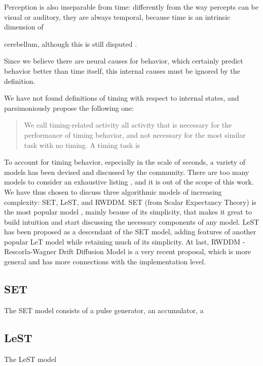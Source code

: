     
    
    
    Perception is also inseparable from time: differently from the way percepts can be visual or auditory, they are always temporal, because time is an intrinsic dimension of  
 
 
    cerebellum, although this is still disputed \cite{ohmae2017cerebellar, nichelli1996perceptual}.
 
    Since we believe there are neural causes for behavior, which certainly predict behavior better than time itself, this internal causes must be ignored by the definition. 
 
    We have not found definitions of timing with respect to internal states, and parsimoniously propose the following one: 
    \begin{quote}
    We call timing-related activity all activity that is necessary for the performance of timing behavior, and not necessary for the most similar task with no timing.
    A timing task is 
    \end{quote}
    
    
    
        To account for timing behavior, especially in the scale of seconds, a variety of models has been devised and discussed by the community. There are too many models to consider an exhaustive listing \cite{}, and it is out of the scope of this work. We have thus chosen to discuss three algorithmic models of increasing complexity: SET, LeST, and RWDDM. SET (from Scalar Expectancy Theory) is the most popular model \cite{}, mainly beause of its simplicity, that makes it great to build intuition and start discussing the necessary components of any model. LeST has been proposed as a descendant of the SET model, adding features of another popular LeT model while retaining much of its simplicity. At last, RWDDM - Rescorla-Wagner Drift Diffusion Model is a very recent proposal, which is more general and has more connections with the implementation level.
    
    \subsection{SET}
        The SET model consists of a pulse generator, an accumulator, a 
        
    \subsection{LeST}
        The LeST model 
    
